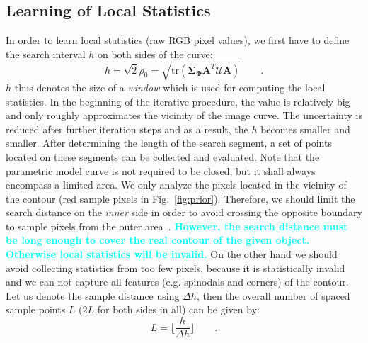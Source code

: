 \documentclass[conference]{IEEEtran}
\newcommand{\review}[1]{\textbf{\textcolor{cyan}{#1}}}
\begin{document}
\subsection{Learning of Local Statistics}
In order to learn local statistics (raw RGB pixel values), we first have 
to define the search interval $h$ on both sides of the curve:
\begin{equation}
  \label{eq:radius}
  h = \sqrt{2} \rho_0 = \sqrt{\mathrm{tr}(\mathbf{\Sigma}_{\mathbf{\Phi}}\mathbf{A}^T\mathcal{U}\mathbf{A})}\qquad.
\end{equation}
$h$ thus denotes the size of a \textit{window} which is used for computing
the local statistics. In the beginning of the iterative procedure, the value
is relatively big and only roughly approximates the vicinity of the image curve. The
uncertainty is reduced after further iteration steps and as a result, the $h$ becomes smaller and
smaller. After determining the length of the search segment, 
a set of points located on these segments can be collected and
evaluated. Note that the parametric model curve is not required to be
closed, but it shall always encompass a limited area. We only 
analyze the pixels located in the vicinity of the contour (red sample
pixels in Fig.~\ref{fig:prior}). Therefore, we should limit the search distance on the
\textit{inner} side in order to avoid crossing the opposite
boundary to sample pixels from the outer area~\cite{panin2006fully}.
\review{However, the search distance must be long enough to cover the real
contour of the given object. Otherwise local statistics will be invalid.} On the other hand we should
avoid collecting statistics from too few pixels, because
it is statistically invalid and we can not capture all features 
(e.g. spinodals and corners) of the contour. Let us denote the
sample distance using $\Delta h$, then the overall number of spaced
sample points $L$ ($2L$ for both sides in all) can be given by:
\begin{equation}
  \label{eq:sample}
  L = \lfloor \frac{h}{\Delta h} \rfloor\qquad.
\end{equation}
\end{document}
